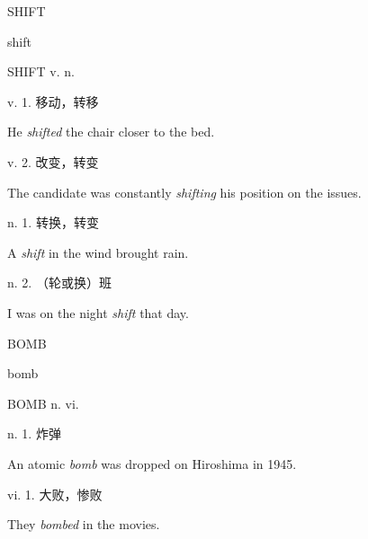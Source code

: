 \begin{flashcard}{
SHIFT

shift
}
\begin{center}
SHIFT v. n. 
\end{center}
v. 1. 移动，转移

He \textit{shifted} the chair closer to the bed.

v. 2. 改变，转变

The candidate was constantly \textit{shifting} his position on the issues.

n. 1. 转换，转变

A \textit{shift} in the wind brought rain.

n. 2. （轮或换）班

I was on the night \textit{shift} that day.

\end{flashcard}
\begin{flashcard}{
BOMB

bomb
}
\begin{center}
BOMB n. vi. \textipa{[b\textopeno m]}
\end{center}
n. 1. 炸弹

An atomic \textit{bomb} was dropped on Hiroshima in 1945.

vi. 1. 大败，惨败

They \textit{bombed} in the movies.

\end{flashcard}
